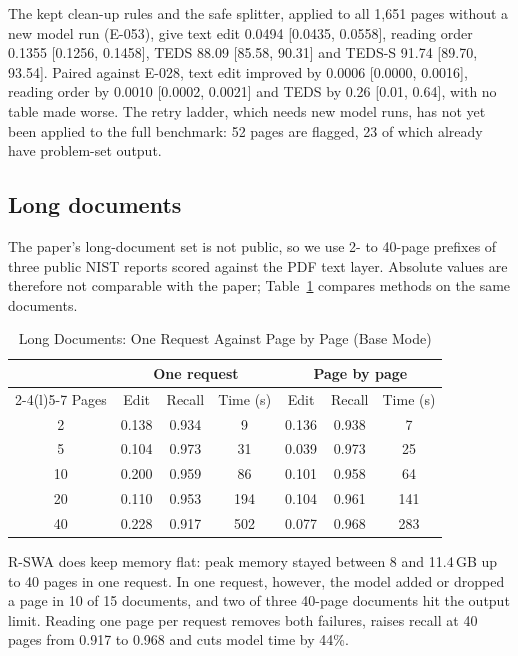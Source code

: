 \documentclass[journal]{IEEEtran}
\begin{document}
The kept clean-up rules and the safe splitter, applied to all 1,651 pages
without a new model run (E-053), give text edit 0.0494 [0.0435, 0.0558],
reading order 0.1355 [0.1256, 0.1458], TEDS 88.09 [85.58, 90.31] and TEDS-S
91.74 [89.70, 93.54]. Paired against E-028, text edit improved by 0.0006
[0.0000, 0.0016], reading order by 0.0010 [0.0002, 0.0021] and TEDS by 0.26
[0.01, 0.64], with no table made worse. The retry ladder, which needs new model
runs, has not yet been applied to the full benchmark: 52 pages are flagged, 23
of which already have problem-set output.

\subsection{Long documents}

The paper's long-document set is not public, so we use 2- to 40-page prefixes
of three public NIST reports scored against the PDF text layer. Absolute values
are therefore not comparable with the paper; Table~\ref{tab:long} compares
methods on the same documents.

\begin{table}[!t]
\caption{Long Documents: One Request Against Page by Page (Base Mode)}
\label{tab:long}
\centering
\footnotesize
\setlength{\tabcolsep}{3.5pt}
\begin{tabular}{@{}ccccccc@{}}
\toprule
 & \multicolumn{3}{c}{One request} & \multicolumn{3}{c}{Page by page} \\
\cmidrule(lr){2-4}\cmidrule(l){5-7}
Pages & Edit & Recall & Time (s) & Edit & Recall & Time (s) \\
\midrule
2 & 0.138 & 0.934 & 9 & 0.136 & 0.938 & 7 \\
5 & 0.104 & 0.973 & 31 & 0.039 & 0.973 & 25 \\
10 & 0.200 & 0.959 & 86 & 0.101 & 0.958 & 64 \\
20 & 0.110 & 0.953 & 194 & 0.104 & 0.961 & 141 \\
40 & 0.228 & 0.917 & 502 & 0.077 & 0.968 & 283 \\
\bottomrule
\end{tabular}
\end{table}

R-SWA does keep memory flat: peak memory stayed between 8 and 11.4\,GB up to 40
pages in one request. In one request, however, the model added or dropped a page
in 10 of 15 documents, and two of three 40-page documents hit the output limit.
Reading one page per request removes both failures, raises recall at 40 pages
from 0.917 to 0.968 and cuts model time by 44\%.
\end{document}
